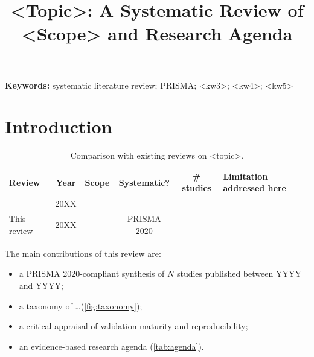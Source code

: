 \documentclass[11pt,a4paper]{article}
\title{<Topic>: A Systematic Review of <Scope> and Research Agenda}
\author{\authorinput{Authors, affiliations, ORCID, corresponding e-mail}}
\date{}
\begin{document}
\maketitle

\begin{abstract}
\end{abstract}

\noindent\textbf{Keywords:} systematic literature review; PRISMA; <kw3>; <kw4>; <kw5>


\section{Introduction}\label{sec:intro}

\begin{table}[t]
\centering
\caption{Comparison with existing reviews on <topic>.}\label{tab:prior}
\small
\begin{tabularx}{\linewidth}{@{}l c X c c X@{}}
\toprule
Review & Year & Scope & Systematic? & \# studies & Limitation addressed here \\
\midrule
\cite{key} & 20XX & & & & \\
This review & 20XX & & PRISMA 2020 & & \\
\bottomrule
\end{tabularx}
\end{table}

The main contributions of this review are:
\begin{itemize}
  \item a PRISMA 2020-compliant synthesis of $N$ studies published between YYYY and YYYY;
  \item a taxonomy of \ldots (\cref{fig:taxonomy});
  \item a critical appraisal of validation maturity and reproducibility;
  \item an evidence-based research agenda (\cref{tab:agenda}).
\end{itemize}
\end{document}
